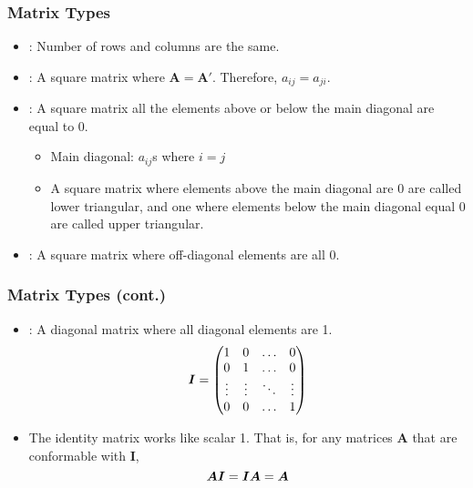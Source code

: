 \documentclass[pdflatex, 12pt]{beamer}
\begin{document}
\begin{frame}
\frametitle{Matrix Types}
\begin{itemize}
\item {\color{red}{Square Matrix}}: Number of rows and columns are the same. 
\vspace{0.4cm}
\item {\color{red}{Symmetric Matrix}}: A square matrix where $\bm{A} = \bm{A'}$. Therefore, $a_{ij} = a_{ji}$.
\vspace{0.4cm}
\item {\color{red}{Triangular Matrix}}: A square matrix all the elements above or below the main diagonal are equal to 0.
 \begin{itemize}
 \item Main diagonal: $a_{ij}$s where $i = j$
 \item A square matrix where elements above the main diagonal are 0 are called {\color{red}lower triangular}, and one where elements below the main diagonal equal 0 are called {\color{red} upper triangular}.
 \end{itemize}
\vspace{0.4cm}
\item {\color{red}{Diagonal Matrix}}: A square matrix where off-diagonal elements are all 0.
\end{itemize}
\end{frame}

\begin{frame}
\frametitle{Matrix Types (cont.)}
\begin{itemize}
\item {\color{red}{Identity Matrix}}: A diagonal matrix where all diagonal elements are 1.
 \begin{equation}
 \bm{I} = \begin{pmatrix}
 1 & 0 & \ldots & 0 \\
 0 & 1 & \ldots & 0 \\
 \vdots & \vdots & \ddots & \vdots \\
 0 & 0 & \ldots & 1 \\
 \end{pmatrix} \notag
 \end{equation}
\item The identity matrix works like scalar 1. That is, for any matrices $\bm{A}$ that are conformable with $\bm{I}$, 
 \begin{equation}
 \bm{AI} = \bm{IA} = \bm{A} \notag
 \end{equation}
\end{itemize}
\end{frame}
\end{document}

